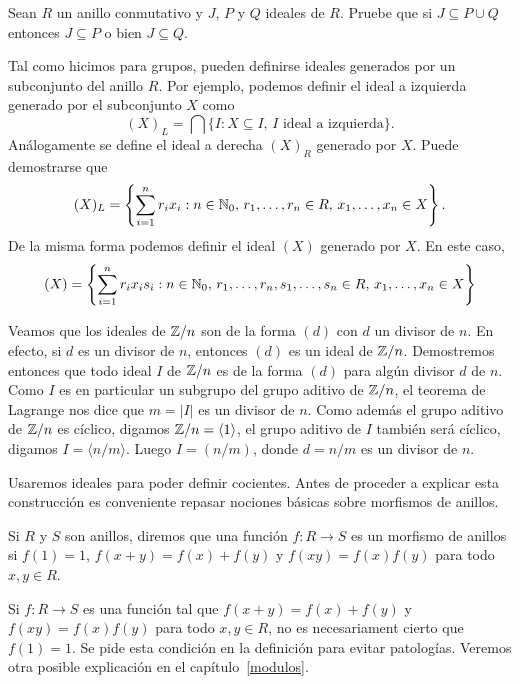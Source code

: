 \begin{exercise}
\label{xca:PcapQ}
    Sean $R$ un anillo conmutativo y $J$, $P$ y $Q$ ideales de $R$. Pruebe
    que si $J\subseteq P\cup Q$ entonces $J\subseteq P$ o bien $J\subseteq Q$.
\end{exercise}

Tal como hicimos para grupos, pueden definirse ideales generados por un subconjunto del anillo $R$. Por ejemplo, 
podemos definir el ideal a izquierda generado por el subconjunto $X$ como
\[
(X)_L = \bigcap\{I:X\subseteq I,\,I\text{ ideal a izquierda}\}.
\]
Análogamente se define el ideal a derecha $(X)_R$ generado por $X$.  
Puede demostrarse que
\[
(X)_L=\left\{\sum_{i=1}^nr_ix_i:n\in\mathbb{N}_0,\,r_1,\dots,r_n\in R,\,x_1,\dots,x_n\in X\right\}. 
\]
De la misma forma podemos definir el ideal $(X)$ generado por $X$. En este caso, 
\[
(X) = \left\{\sum_{i=1}^nr_ix_is_i:n\in\mathbb{N}_0,\,r_1,\dots,r_n,s_1,\dots,s_n\in R,\,x_1,\dots,x_n\in X\right\}
\]

\begin{example}
Veamos que los ideales de $\mathbb{Z}/n$ son de la forma $(d)$ con $d$ un divisor de $n$. En efecto, si 
$d$ es un divisor de $n$, entonces $(d)$ es un ideal de $\mathbb{Z}/n$. Demostremos entonces
que todo ideal $I$ de $\mathbb{Z}/n$ es de la forma $(d)$ para algún divisor $d$ de $n$. Como
$I$ es en particular un subgrupo del grupo aditivo de $\mathbb{Z}/n$, el teorema de Lagrange nos dice que 
$m=|I|$ es un divisor de $n$. Como además el grupo
aditivo de $\mathbb{Z}/n$ es cíclico, digamos $\mathbb{Z}/n=\langle 1\rangle$, el grupo aditivo de $I$ también será cíclico, digamos
$I=\langle n/m\rangle$. Luego $I=(n/m)$, donde $d=n/m$ es un divisor de $n$.  
\end{example}

Usaremos ideales para poder definir cocientes. 
Antes de proceder a explicar esta construcción es 
conveniente repasar nociones básicas sobre morfismos de anillos. 

\begin{definition}
Si $R$ y $S$ son anillos, diremos que una función $f\colon R\to S$ es un morfismo de anillos si $f(1)=1$, 
$f(x+y)=f(x)+f(y)$ y $f(xy)=f(x)f(y)$ para todo $x,y\in R$. 	
\end{definition}

Si $f\colon R\to S$ es una función tal que $f(x+y)=f(x)+f(y)$ y $f(xy)=f(x)f(y)$ para todo $x,y\in R$, 
no es necesariament cierto que $f(1)=1$. Se pide esta condición en la definición para evitar patologías. Veremos 
otra posible explicación en el capítulo~\ref{modulos}.

